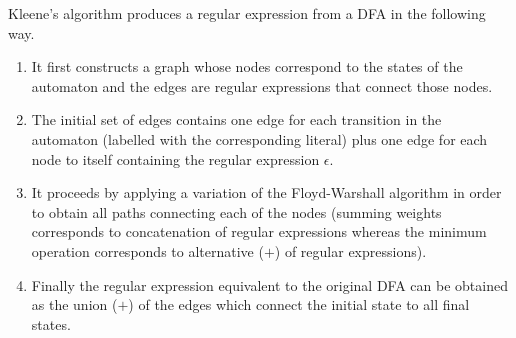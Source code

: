 Kleene's algorithm produces a regular expression from a DFA in the following way.
\begin{enumerate}
    \item It first constructs a graph whose nodes correspond to the states of the automaton and the edges are regular expressions that connect those nodes. 
    \item The initial set of edges contains one edge for each transition in the automaton (labelled with the corresponding literal) plus one edge for each node to itself containing the regular expression $\epsilon$.
    \item It proceeds by applying a variation of the Floyd-Warshall algorithm in order to obtain all paths connecting each of the nodes (summing weights corresponds to concatenation of regular expressions whereas the minimum operation corresponds to alternative ($+$) of regular expressions).
    \item Finally the regular expression equivalent to the original DFA can be obtained as the union ($+$) of the edges which connect the initial state to all final states.
\end{enumerate}